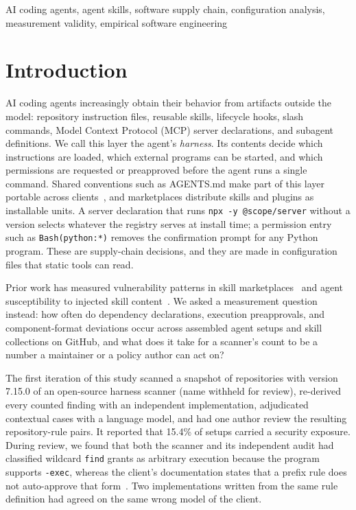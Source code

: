 \documentclass[10pt,conference]{IEEEtran}
\newcommand{\vold}{7.15.0}
\begin{document}
\begin{IEEEkeywords}
AI coding agents, agent skills, software supply chain, configuration analysis, measurement validity, empirical software engineering
\end{IEEEkeywords}

\section{Introduction}

AI coding agents increasingly obtain their behavior from artifacts outside the model: repository instruction files, reusable skills, lifecycle hooks, slash commands, Model Context Protocol (MCP) server declarations, and subagent definitions. We call this layer the agent's \emph{harness}. Its contents decide which instructions are loaded, which external programs can be started, and which permissions are requested or preapproved before the agent runs a single command. Shared conventions such as AGENTS.md make part of this layer portable across clients~\cite{agentsmd2026}, and marketplaces distribute skills and plugins as installable units. A server declaration that runs \texttt{npx -y @scope/server} without a version selects whatever the registry serves at install time; a permission entry such as \texttt{Bash(python:*)} removes the confirmation prompt for any Python program. These are supply-chain decisions, and they are made in configuration files that static tools can read.

Prior work has measured vulnerability patterns in skill marketplaces~\cite{liu2026skills,liu2026malicious} and agent susceptibility to injected skill content~\cite{schmotz2026skillinject}. We asked a measurement question instead: how often do dependency declarations, execution preapprovals, and component-format deviations occur across assembled agent setups and skill collections on GitHub, and what does it take for a scanner's count to be a number a maintainer or a policy author can act on?

The first iteration of this study scanned a snapshot of \NCorpus{} repositories with version \vold{} of an open-source harness scanner (name withheld for review), re-derived every counted finding with an independent implementation, adjudicated contextual cases with a language model, and had one author review the resulting repository-rule pairs. It reported that 15.4\% of setups carried a security exposure. During review, we found that both the scanner and its independent audit had classified wildcard \texttt{find} grants as arbitrary execution because the program supports \texttt{-exec}, whereas the client's documentation states that a prefix rule does not auto-approve that form~\cite{claude_permissions}. Two implementations written from the same rule definition had agreed on the same wrong model of the client.
\end{document}

